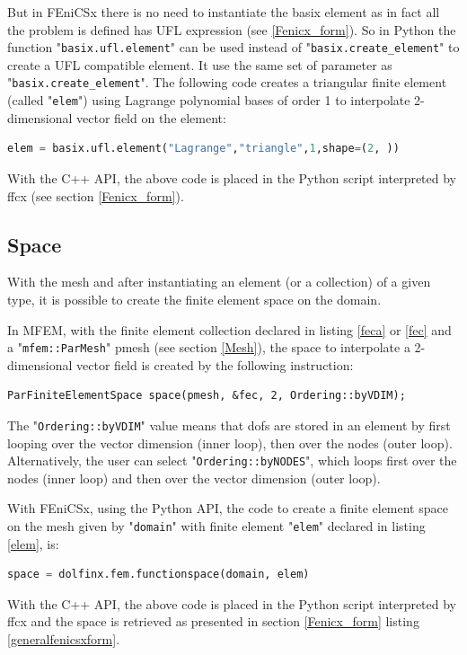 \documentclass[12pt]{article}
\newcommand{\f}[1]{FEniCSx#1}
\newcommand{\mycode}[1]{\textsf{"}\lstinline`#1`\textsf{"}}
\newcommand{\mycodepy}[1]{\textsf{"}\lstinline[language=Python]`#1`\textsf{"}}
\begin{document}
But in  \f{} there is no need to instantiate the basix element as in fact all the problem is defined has UFL expression (see \ref{Fenicx_form}). So in Python the function \mycodepy{basix.ufl.element} can be used instead of \mycodepy{basix.create_element} to create a UFL compatible element. It use the same set of parameter as \mycodepy{basix.create_element}. The following code creates a triangular finite element (called \mycodepy{elem}) using Lagrange polynomial bases of order 1 to interpolate 2-dimensional vector field on the element:\begin{lstlisting}[numbers=none,basicstyle=\footnotesize,language=Python,label=elem]
	elem = basix.ufl.element("Lagrange","triangle",1,shape=(2, ))
\end{lstlisting}
With the C++ API, the above code is placed in the Python script interpreted by ffcx (see section \ref{Fenicx_form}).

\subsection{Space} 
With the mesh and after instantiating an element (or a collection) of a given type, it is possible to create the finite element space on the domain.
 
In MFEM, with the finite element collection declared in listing \ref{feca} or \ref{fec} and a \mycode{mfem::ParMesh} pmesh (see section \ref{Mesh}), the space to interpolate a 2-dimensional vector field is created by the following instruction:
\begin{lstlisting}[numbers=none,basicstyle=\footnotesize,label=spacec]
ParFiniteElementSpace space(pmesh, &fec, 2, Ordering::byVDIM);
\end{lstlisting}
The \mycode{Ordering::byVDIM} value means that dofs are stored in an element by first looping over the  vector dimension (inner loop), then over the nodes (outer loop).
Alternatively, the user can select \mycode{Ordering::byNODES}, which loops first over the
 nodes (inner loop) and then over the vector dimension (outer loop).



With \f{}, using the Python API, the code to create a finite element space on the mesh given by \mycodepy{domain} with finite element \mycodepy{elem} declared in listing \ref{elem}, is:
\begin{lstlisting}[numbers=none,basicstyle=\footnotesize,language=Python]
space = dolfinx.fem.functionspace(domain, elem)
\end{lstlisting}
With the C++ API, the above code is placed in the Python script interpreted by ffcx and the space is retrieved as presented in  section \ref{Fenicx_form} listing \ref{generalfenicsxform}.  
\end{document}
